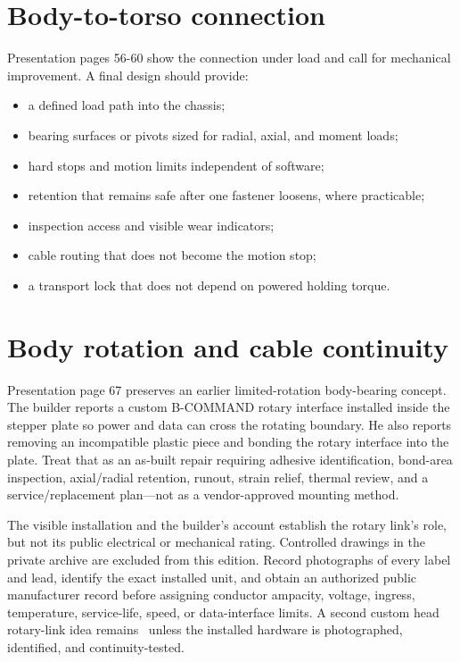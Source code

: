 \documentclass[10pt,openany]{book}
\begin{document}
\section{Body-to-torso connection}

Presentation pages 56-60 show the connection under load and call for mechanical improvement. A final design should provide:

\begin{itemize}
  \item a defined load path into the chassis;
  \item bearing surfaces or pivots sized for radial, axial, and moment loads;
  \item hard stops and motion limits independent of software;
  \item retention that remains safe after one fastener loosens, where practicable;
  \item inspection access and visible wear indicators;
  \item cable routing that does not become the motion stop;
  \item a transport lock that does not depend on powered holding torque.
\end{itemize}

\section{Body rotation and cable continuity}

Presentation page 67 preserves an earlier limited-rotation body-bearing concept. The builder reports a custom B-COMMAND rotary interface installed inside the stepper plate so power and data can cross the rotating boundary. He also reports removing an incompatible plastic piece and bonding the rotary interface into the plate. Treat that as an as-built repair requiring adhesive identification, bond-area inspection, axial/radial retention, runout, strain relief, thermal review, and a service/replacement plan---not as a vendor-approved mounting method.

The visible installation and the builder's account establish the rotary link's role, but not its public electrical or mechanical rating. Controlled drawings in the private archive are excluded from this edition. Record photographs of every label and lead, identify the exact installed unit, and obtain an authorized public manufacturer record before assigning conductor ampacity, voltage, ingress, temperature, service-life, speed, or data-interface limits. A second custom head rotary-link idea remains \Planned\ unless the installed hardware is photographed, identified, and continuity-tested.
\end{document}
